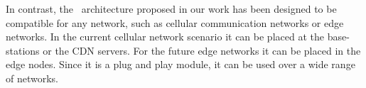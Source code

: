 \indent In contrast, the \bel\ architecture proposed in our work has been designed to be compatible for any network, such as cellular communication networks or edge networks. In the current cellular network scenario it can be placed at the base-stations or the \ac{CDN} servers. For the future edge networks it can be placed in the edge nodes. Since it is a plug and play module, it can be used over a wide range of networks.


